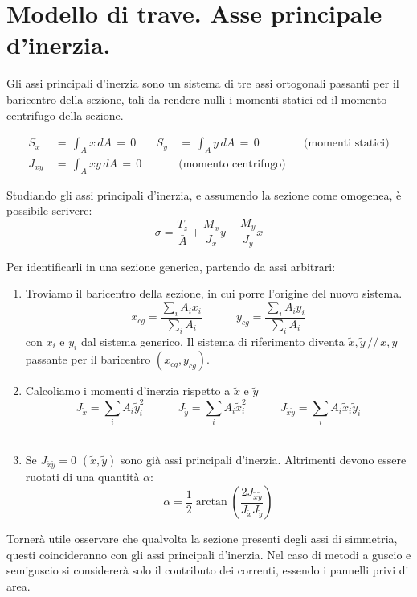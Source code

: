 \section{Modello di trave. Asse principale d'inerzia.}

Gli assi principali d'inerzia sono un sistema di tre assi ortogonali passanti per il baricentro della sezione, tali da rendere nulli i momenti statici ed il momento centrifugo della sezione.


\begin{align*}
    S_x \, &=\, \int_{\bar{A}} x \, dA \,=\,0 \quad & S_y \, &=\, \int_{\bar{A}} y \, dA\,=\,0 &&\text{(momenti statici)}\\
    J_{xy} \, &=\, \int_{\bar{A}} xy \, dA\,=\,0 &&\text{(momento centrifugo)}
\end{align*}

Studiando gli assi principali d'inerzia, e assumendo la sezione come omogenea, è possibile scrivere:
\begin{equation*}
        \sigma = \frac{T_z}{\bar{A}} +  \frac{M_x}{J_x}y -\frac{M_y}{J_y}x 
 \end{equation*}

 Per identificarli in una sezione generica, partendo da assi arbitrari:
 \begin{enumerate}
     \item Troviamo il baricentro della sezione, in cui porre l'origine del nuovo sistema.
     \begin{equation*}
     x_{cg} = \frac{\sum_i A_i x_i}{\sum_i A_i} \quad\quad\quad
     y_{cg} = \frac{\sum_i A_i y_i}{\sum_i A_i}
    \end{equation*}
    con $x_i$ e $y_i$ dal sistema generico. Il sistema di riferimento diventa $\tilde{x}, \tilde{y} \,//\,x,y$ passante per il baricentro $(x_{cg},y_{cg})$.\\
    \item Calcoliamo i momenti d'inerzia rispetto a $\tilde{x}$ e $\tilde{y}$
    \begin{equation*}
     J_{\tilde{x}} = \sum_i A_i \tilde{y}_i^2 \quad\quad\quad
     J_{\tilde{y}} = \sum_i A_i \tilde{x}_i^2 \quad\quad\quad
     J_{\tilde{x}\tilde{y}} = \sum_i A_i \tilde{x}_i \tilde{y}_i
    \end{equation*}\\
    \item Se $ J_{\tilde{x}\tilde{y}} = 0$ $(\tilde{x},\tilde{y})$ sono già assi principali d'inerzia. Altrimenti devono essere ruotati di una quantità $\alpha$:
    \begin{equation*}
        \alpha = \frac{1}{2} \arctan\left(\frac{2 J_{\tilde{x}\tilde{y}} }{J_{\tilde{x}} J_{\tilde{y}} }\right)
    \end{equation*}
 \end{enumerate}

 Tornerà utile osservare che qualvolta la sezione presenti degli assi di simmetria, questi coincideranno con gli assi principali d'inerzia. Nel caso di metodi a guscio e semiguscio si considererà solo il contributo dei correnti, essendo i pannelli privi di area.


